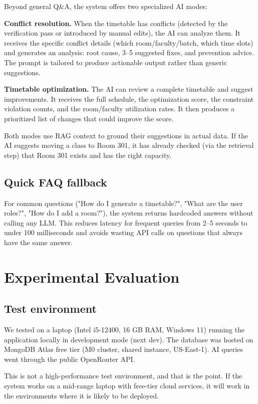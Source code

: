\documentclass[conference]{IEEEtran}
\begin{document}
Beyond general Q\&A, the system offers two specialized AI modes:

\textbf{Conflict resolution.} When the timetable has conflicts (detected by the verification pass or introduced by manual edits), the AI can analyze them. It receives the specific conflict details (which room/faculty/batch, which time slots) and generates an analysis: root cause, 3--5 suggested fixes, and prevention advice. The prompt is tailored to produce actionable output rather than generic suggestions.

\textbf{Timetable optimization.} The AI can review a complete timetable and suggest improvements. It receives the full schedule, the optimization score, the constraint violation counts, and the room/faculty utilization rates. It then produces a prioritized list of changes that could improve the score.

Both modes use RAG context to ground their suggestions in actual data. If the AI suggests moving a class to Room 301, it has already checked (via the retrieval step) that Room 301 exists and has the right capacity.

\subsection{Quick FAQ fallback}

For common questions ("How do I generate a timetable?", "What are the user roles?", "How do I add a room?"), the system returns hardcoded answers without calling any LLM. This reduces latency for frequent queries from 2--5 seconds to under 100 milliseconds and avoids wasting API calls on questions that always have the same answer.


\section{Experimental Evaluation}

\subsection{Test environment}

We tested on a laptop (Intel i5-12400, 16 GB RAM, Windows 11) running the application locally in development mode (next dev). The database was hosted on MongoDB Atlas free tier (M0 cluster, shared instance, US-East-1). AI queries went through the public OpenRouter API.

This is not a high-performance test environment, and that is the point. If the system works on a mid-range laptop with free-tier cloud services, it will work in the environments where it is likely to be deployed.
\end{document}
